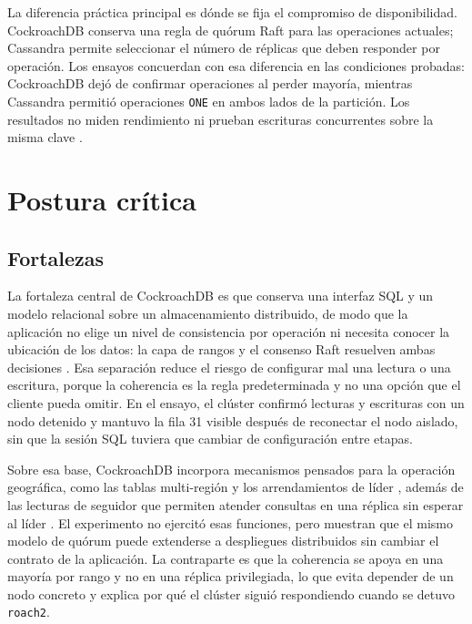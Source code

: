 \documentclass[11pt,a4paper]{article}
\newcommand{\sistemaA}{CockroachDB}      %
\begin{document}
La diferencia práctica principal es dónde se fija el compromiso de disponibilidad. CockroachDB conserva una regla de quórum Raft para las operaciones actuales; Cassandra permite seleccionar el número de réplicas que deben responder por operación. Los ensayos concuerdan con esa diferencia en las condiciones probadas: CockroachDB dejó de confirmar operaciones al perder mayoría, mientras Cassandra permitió operaciones \texttt{ONE} en ambos lados de la partición. Los resultados no miden rendimiento ni prueban escrituras concurrentes sobre la misma clave \cite{cockroachlabsReplication,apacheCassandraDynamo}.

\section{Postura crítica}
\subsection{Fortalezas}

La fortaleza central de \sistemaA{} es que conserva una interfaz SQL y un modelo
relacional sobre un almacenamiento distribuido, de modo que la aplicación no elige
un nivel de consistencia por operación ni necesita conocer la ubicación de los
datos: la capa de rangos y el consenso Raft resuelven ambas decisiones
\cite{cockroachlabsArchitecture,cockroachlabsReplication}. Esa separación reduce el
riesgo de configurar mal una lectura o una escritura, porque la coherencia es la
regla predeterminada y no una opción que el cliente pueda omitir. En el ensayo, el
clúster confirmó lecturas y escrituras con un nodo detenido y mantuvo la fila 31
visible después de reconectar el nodo aislado, sin que la sesión SQL tuviera que
cambiar de configuración entre etapas.

Sobre esa base, \sistemaA{} incorpora mecanismos pensados para la operación
geográfica, como las tablas multi-región y los arrendamientos de líder
\cite{vanbenschoten2022multiregion,kettaneh2026leaderleases}, además de las
lecturas de seguidor que permiten atender consultas en una réplica sin esperar al
líder \cite{cockroachlabsFollowerReads}. El experimento no ejercitó esas funciones,
pero muestran que el mismo modelo de quórum puede extenderse a despliegues
distribuidos sin cambiar el contrato de la aplicación. La contraparte es que la
coherencia se apoya en una mayoría por rango y no en una réplica privilegiada, lo
que evita depender de un nodo concreto y explica por qué el clúster siguió
respondiendo cuando se detuvo \texttt{roach2}.
\end{document}
